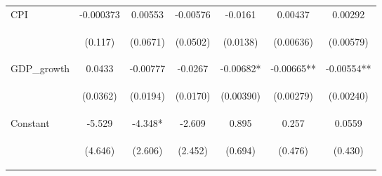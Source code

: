 \documentclass[]{article}
\begin{document}
\begin{center}
\begin{tabular}{lcccccc}
CPI & -0.000373 & 0.00553 & -0.00576 & -0.0161 & 0.00437 & 0.00292 \\
\vspace{4pt} & \begin{footnotesize}(0.117)\end{footnotesize} & \begin{footnotesize}(0.0671)\end{footnotesize} & \begin{footnotesize}(0.0502)\end{footnotesize} & \begin{footnotesize}(0.0138)\end{footnotesize} & \begin{footnotesize}(0.00636)\end{footnotesize} & \begin{footnotesize}(0.00579)\end{footnotesize} \\
GDP\_growth & 0.0433 & -0.00777 & -0.0267 & -0.00682* & -0.00665** & -0.00554** \\
\vspace{4pt} & \begin{footnotesize}(0.0362)\end{footnotesize} & \begin{footnotesize}(0.0194)\end{footnotesize} & \begin{footnotesize}(0.0170)\end{footnotesize} & \begin{footnotesize}(0.00390)\end{footnotesize} & \begin{footnotesize}(0.00279)\end{footnotesize} & \begin{footnotesize}(0.00240)\end{footnotesize} \\
Constant & -5.529 & -4.348* & -2.609 & 0.895 & 0.257 & 0.0559 \\
 & \begin{footnotesize}(4.646)\end{footnotesize} & \begin{footnotesize}(2.606)\end{footnotesize} & \begin{footnotesize}(2.452)\end{footnotesize} & \begin{footnotesize}(0.694)\end{footnotesize} & \begin{footnotesize}(0.476)\end{footnotesize} & \begin{footnotesize}(0.430)\end{footnotesize} \\

\end{tabular}
\end{center}
\end{document}
